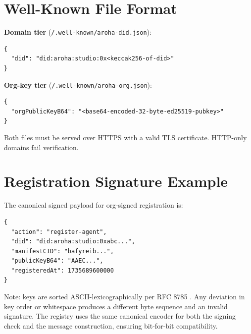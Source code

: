 \documentclass[conference]{IEEEtran}
\begin{document}



\appendix

\section{Well-Known File Format}
\label{app:wellknown}

\textbf{Domain tier} (\texttt{/.well-known/aroha-did.json}):
\begin{verbatim}
{
  "did": "did:aroha:studio:0x<keccak256-of-did>"
}
\end{verbatim}

\textbf{Org-key tier} (\texttt{/.well-known/aroha-org.json}):
\begin{verbatim}
{
  "orgPublicKeyB64": "<base64-encoded-32-byte-ed25519-pubkey>"
}
\end{verbatim}

Both files must be served over HTTPS with a valid TLS
certificate. HTTP-only domains fail verification.

\section{Registration Signature Example}
\label{app:sig_example}

The canonical signed payload for org-signed registration is:

\begin{verbatim}
{
  "action": "register-agent",
  "did": "did:aroha:studio:0xabc...",
  "manifestCID": "bafyreib...",
  "publicKeyB64": "AAEC...",
  "registeredAt": 1735689600000
}
\end{verbatim}

Note: keys are sorted ASCII-lexicographically per
RFC 8785 \cite{jsoncanon}. Any deviation in key order or
whitespace produces a different byte sequence and an invalid
signature. The registry uses the same canonical encoder for
both the signing check and the message construction, ensuring
bit-for-bit compatibility.
\end{document}
